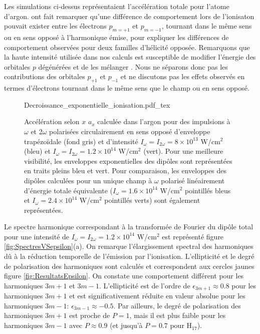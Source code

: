 Les simulations ci-dessus représentaient l'accélération totale pour l'atome d'argon.  ont fait remarquer qu'une différence de comportement lors de l'ionisaton pouvait exister entre les électrons $p_{m=+1}$ et $p_{m=-1}$, tournant dans le même sens ou en sens opposé à l'harmonique émise, pour expliquer les différences de comportement observées pour deux familles d'hélicité opposée. Remarquons que la haute intensité utilisée dans nos calculs est susceptible de modifier l'énergie des orbitales $p$ dégénérées et de les mélanger . Nous ne séparons donc pas les contributions des orbitales $p_{+1}$ et $p_{-1}$ et ne discutons pas les effets observés en termes d'électrons tournant dans le même sens que le champ ou en sens opposé.

\begin{figure}
\centering
\def\svgwidth{0.8\textwidth}
{Decroissance_exponentielle_ionisation.pdf_tex}
\caption{Accélération selon $x$ $a_x$ calculée dans l'argon pour des impulsions à $\omega$ et 2$\omega$ polarisées circulairement en sens opposé d'enveloppe trapézoïdale (fond gris) et d'intensité $I_\omega = I_{2\omega} = 8 \times 10^{13}$ W/cm$^2$ (bleu) et $I_\omega = I_{2\omega} = 1.2 \times 10^{14}$ W/cm$^2$ (vert). Pour une meilleure visibilité, les enveloppes exponentielles des dipôles sont représentées en traits pleins bleu et vert. Pour comparaison, les enveloppes des dipôles calculées pour un unique champ à $\omega$ polarisé linéairement d'énergie totale équivalente ($I_\omega = 1.6 \times 10^{14}$ W/cm$^2$ pointillés bleus et $I_\omega = 2.4 \times 10^{14}$ W/cm$^2$ pointillés verts) sont également représentées.}
\label{fig:Decroissance_exponentielle_ionisation}
\end{figure}

Le spectre harmonique correspondant à la transformée de Fourier du dipôle total pour une intensité de $I_\omega = I_{2\omega} = 1.2 \times 10^{14}$ W/cm$^2$ est représenté figure \ref{fig:SpectresVSepsilon}(a). On remarque l'élargissement spectral des harmoniques dû à la réduction temporelle de l'émission par l'ionisation. L'ellipticité et le degré de polarisation des harmoniques sont calculés et correspondent aux cercles jaunes figure \ref{fig:ResultatsEpsilon}. On constate une comportement différent pour les harmoniques $3m+1$ et $3m-1$. L'ellipticité est de l'ordre de $\epsilon_{3m+1} \approx 0.8$ pour les harmoniques $3m+1$ et est significativement réduite en valeur absolue pour les harmoniques $3m-1$: $\epsilon_{3m-1} \approx -0.5$. Par ailleurs, le degré de polarisation des harmoniques $3m+1$ est proche de $P = 1$, mais il est plus faible pour les harmoniques $3m-1$ avec $P \approx 0.9$ (et jusqu'à $P = 0.7$ pour H$_{17}$).

